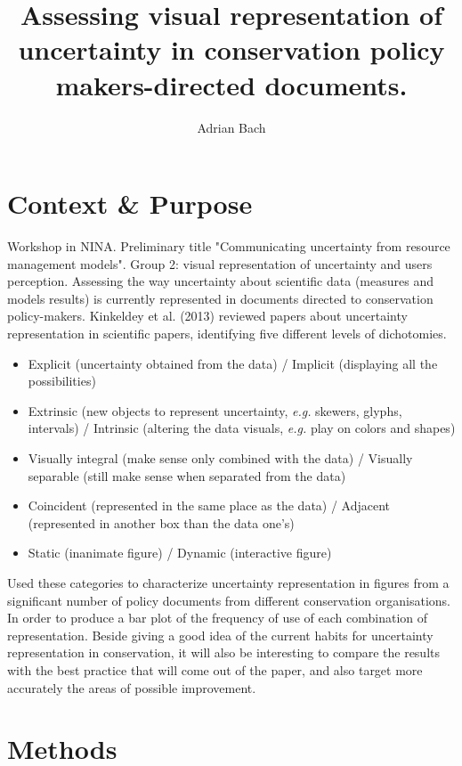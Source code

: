 \documentclass[12pt,a4paper,draft]{article}
\author{Adrian Bach}
\title{Assessing visual representation of uncertainty in conservation policy makers-directed documents.}
\begin{document}
\maketitle

\tableofcontents

\section{Context \& Purpose}

Workshop in NINA.
Preliminary title "Communicating uncertainty from resource management models".
Group 2: visual representation of uncertainty and users perception.
Assessing the way uncertainty about scientific data (measures and models results) is currently represented in documents directed to conservation policy-makers.
Kinkeldey et al. (2013) reviewed papers about uncertainty representation in scientific papers, identifying five different levels of dichotomies.
\begin{itemize}
\item Explicit (uncertainty obtained from the data) / Implicit (displaying all the possibilities)
\item Extrinsic (new objects to represent uncertainty, \textit{e.g.} skewers, glyphs, intervals) / Intrinsic (altering the data visuals, \textit{e.g.} play on colors and shapes)
\item Visually integral (make sense only combined with the data) / Visually separable (still make sense when  separated from the data)
\item Coincident (represented in the same place as the data) / Adjacent (represented in another box than the data one's)
\item Static (inanimate figure) / Dynamic (interactive figure)
\end{itemize}
Used these categories to characterize uncertainty representation in figures from a significant number of policy documents from different conservation organisations.
In order to produce a bar plot of the frequency of use of each combination of representation.
Beside giving a good idea of the current habits for uncertainty representation in conservation, it will also be interesting to compare the results with the best practice that will come out of the paper, and also target more accurately the areas of possible improvement.

\section{Methods}
\end{document}
